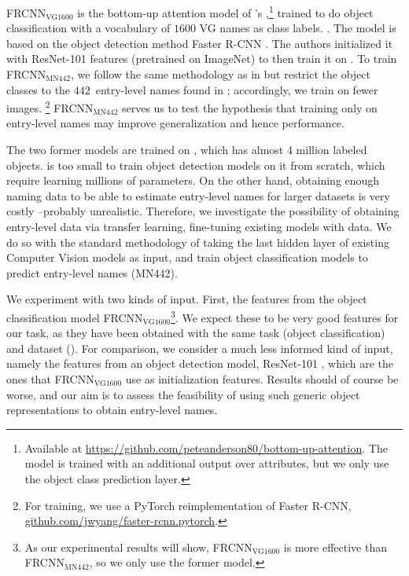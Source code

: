 FRCNN$_{\text{VG1600}}$ is the bottom-up attention model of \citeauthor{anderson2018updown}'s \citeyear{anderson2018updown},\footnote{Available at \url{https://github.com/peteanderson80/bottom-up-attention}. The model is trained with an additional output over attributes, but we only use the object class prediction layer.}
trained to do object classification with a vocabulary of $1600$ VG names as class labels. .
The model is based on the object detection  method Faster R-CNN \cite{fasterrcnn2015}. 
The authors initialized it with ResNet-101 \cite{he2016deep} features (pretrained on ImageNet) to then train it on \vg.
To train FRCNN$_{\text{MN442}}$, we follow the same methodology as in \citeauthor{anderson2018updown}  but restrict the object classes to the $442$~entry-level names found in \mn; accordingly, we train on fewer images. 
\footnote{For training, we use a PyTorch reimplementation of Faster R-CNN, \url{github.com/jwyang/faster-rcnn.pytorch}.}
FRCNN$_{\text{MN442}}$ serves us to test the hypothesis that training only on entry-level names may improve generalization and hence performance.

The two former models are trained on \vg, which has almost 4 million labeled objects.
\mn is too small to train object detection models on it from scratch, which require learning millions of parameters.
On the other hand, obtaining enough naming data to be able to estimate entry-level names for larger datasets is very costly --probably unrealistic.
Therefore, we investigate the possibility of obtaining entry-level data via transfer learning, fine-tuning existing models with \mn data.
We do so with the standard methodology  of taking the last hidden layer of existing Computer Vision models as input, and train object classification models to predict entry-level names (MN442).

We experiment with two kinds of input. First, the features from the object classification model FRCNN$_{\text{VG1600}}$\footnote{As our experimental results will show, FRCNN$_{\text{VG1600}}$ is more effective than FRCNN$_{\text{MN442}}$, so we only use the former model.}. 
We expect these to be very good features for our task, as they have been obtained with the same task (object classification) and dataset (\vg).
For comparison, we consider a much less informed kind of input, namely the features from an object detection model, ResNet-101 \cite{+++}, which are the ones that FRCNN$_{\text{VG1600}}$ use as initialization features. 
Results should of course be worse, and our aim is to assess the feasibility of using such generic object representations to obtain entry-level names.

